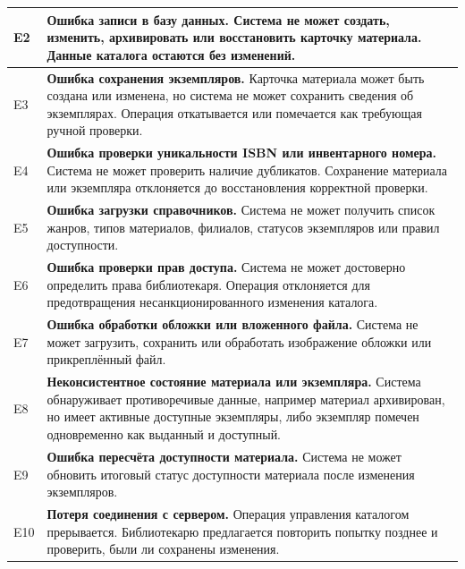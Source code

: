 \documentclass[12pt,a4paper]{article}
\begin{document}
\begin{xltabular}{\textwidth}{
				|>{\raggedright\arraybackslash}p{2.7cm}
				|>{\raggedright\arraybackslash}X|
			}
			E2 &
			\textbf{Ошибка записи в базу данных.}
			Система не может создать, изменить, архивировать или восстановить
			карточку материала. Данные каталога остаются без изменений. \\
			\hline
			
			E3 &
			\textbf{Ошибка сохранения экземпляров.}
			Карточка материала может быть создана или изменена, но система не может
			сохранить сведения об экземплярах. Операция откатывается или помечается
			как требующая ручной проверки. \\
			\hline
			
			E4 &
			\textbf{Ошибка проверки уникальности ISBN или инвентарного номера.}
			Система не может проверить наличие дубликатов. Сохранение материала
			или экземпляра отклоняется до восстановления корректной проверки. \\
			\hline
			
			E5 &
			\textbf{Ошибка загрузки справочников.}
			Система не может получить список жанров, типов материалов, филиалов,
			статусов экземпляров или правил доступности. \\
			\hline
			
			E6 &
			\textbf{Ошибка проверки прав доступа.}
			Система не может достоверно определить права библиотекаря. Операция
			отклоняется для предотвращения несанкционированного изменения каталога. \\
			\hline
			
			E7 &
			\textbf{Ошибка обработки обложки или вложенного файла.}
			Система не может загрузить, сохранить или обработать изображение обложки
			или прикреплённый файл. \\
			\hline
			
			E8 &
			\textbf{Неконсистентное состояние материала или экземпляра.}
			Система обнаруживает противоречивые данные, например материал
			архивирован, но имеет активные доступные экземпляры, либо экземпляр
			помечен одновременно как выданный и доступный. \\
			\hline
			
			E9 &
			\textbf{Ошибка пересчёта доступности материала.}
			Система не может обновить итоговый статус доступности материала после
			изменения экземпляров. \\
			\hline
			
			E10 &
			\textbf{Потеря соединения с сервером.}
			Операция управления каталогом прерывается. Библиотекарю предлагается
			повторить попытку позднее и проверить, были ли сохранены изменения. \\
			\hline
			

\end{xltabular}
\end{document}
